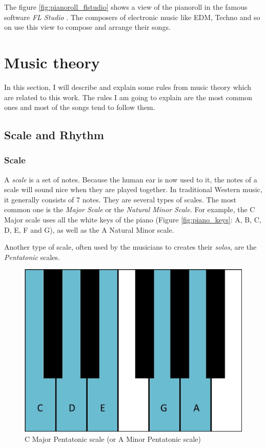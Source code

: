 \documentclass[12pt]{report}
\begin{document}
The figure \ref{fig:pianoroll_flstudio} shows a view of the pianoroll in the famous software \textit{FL Studio} \cite{noauthor_fl_nodate}. The composers of electronic music like EDM, Techno and so on use this view to compose and arrange their songs.


\section{Music theory}
\label{sec:back:music-theory}

In this section, I will describe and explain some rules from music theory which are related to this work.
The rules I am going to explain are the most common ones and most of the songs tend to follow them.

\subsection{Scale and Rhythm}

\subsubsection{Scale}

A \textit{scale} is a set of notes.
Because the human ear is now used to it, the notes of a scale will sound nice when they are played together.
In traditional Western music, it generally consists of 7 notes.
They are several types of scales.
The most common one is the \textit{Major Scale} or the \textit{Natural Minor Scale}.
For example, the C Major scale uses all the white keys of the piano (Figure \ref{fig:piano_keys}: A, B, C, D, E, F and G), as well as the A Natural Minor scale.

Another type of scale, often used by the musicians to creates their \textit{solos}, are the \textit{Pentatonic} scales.


\begin{figure}[H]
    \centering
    \includegraphics[width=0.5 \textwidth]{images/music/piano/pentatonic_scale.jpg}
    \caption{C Major Pentatonic scale (or A Minor Pentatonic scale)}
    \label{fig:pentatonic_scale_piano}
\end{figure}
\end{document}

